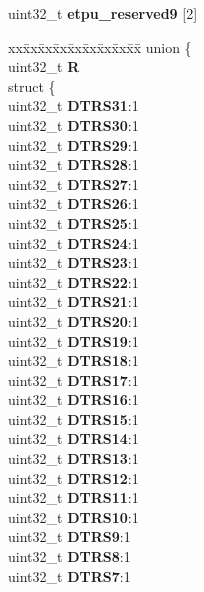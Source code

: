 \begin{DoxyCompactItemize}
\begin{tabbing}
\end{tabbing}\item 
\mbox{\label{structETPU__tag_a8fcb8a9ab7dfa13a61b2ceb3ec38c7ad}} 
uint32\+\_\+t {\bfseries etpu\+\_\+reserved9} \mbox{[}2\mbox{]}
\item 
\mbox{\label{structETPU__tag_a47493c450a1a487f00ec0359fd398e33}} 
\begin{tabbing}
xx\=xx\=xx\=xx\=xx\=xx\=xx\=xx\=xx\=\kill
union \{\\
\>uint32\_t {\bfseries R}\\
\>struct \{\\
\>\>uint32\_t {\bfseries DTRS31}:1\\
\>\>uint32\_t {\bfseries DTRS30}:1\\
\>\>uint32\_t {\bfseries DTRS29}:1\\
\>\>uint32\_t {\bfseries DTRS28}:1\\
\>\>uint32\_t {\bfseries DTRS27}:1\\
\>\>uint32\_t {\bfseries DTRS26}:1\\
\>\>uint32\_t {\bfseries DTRS25}:1\\
\>\>uint32\_t {\bfseries DTRS24}:1\\
\>\>uint32\_t {\bfseries DTRS23}:1\\
\>\>uint32\_t {\bfseries DTRS22}:1\\
\>\>uint32\_t {\bfseries DTRS21}:1\\
\>\>uint32\_t {\bfseries DTRS20}:1\\
\>\>uint32\_t {\bfseries DTRS19}:1\\
\>\>uint32\_t {\bfseries DTRS18}:1\\
\>\>uint32\_t {\bfseries DTRS17}:1\\
\>\>uint32\_t {\bfseries DTRS16}:1\\
\>\>uint32\_t {\bfseries DTRS15}:1\\
\>\>uint32\_t {\bfseries DTRS14}:1\\
\>\>uint32\_t {\bfseries DTRS13}:1\\
\>\>uint32\_t {\bfseries DTRS12}:1\\
\>\>uint32\_t {\bfseries DTRS11}:1\\
\>\>uint32\_t {\bfseries DTRS10}:1\\
\>\>uint32\_t {\bfseries DTRS9}:1\\
\>\>uint32\_t {\bfseries DTRS8}:1\\
\>\>uint32\_t {\bfseries DTRS7}:1\\

\end{tabbing}
\end{DoxyCompactItemize}
